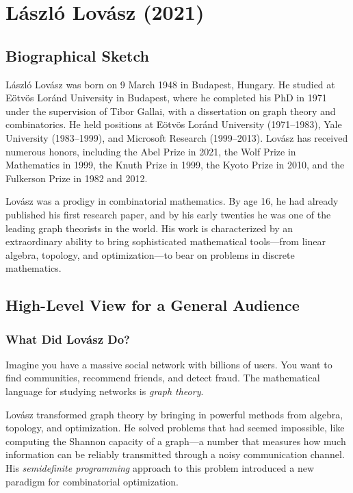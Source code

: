 \chapter{L\'aszl\'o Lov\'asz (2021)}

\section{Biographical Sketch}

L\'aszl\'o Lov\'asz was born on 9 March 1948 in Budapest, Hungary. He studied at E\"otv\"os Lor\'and University in Budapest, where he completed his PhD in 1971 under the supervision of Tibor Gallai, with a dissertation on graph theory and combinatorics. He held positions at E\"otv\"os Lor\'and University (1971--1983), Yale University (1983--1999), and Microsoft Research (1999--2013). Lov\'asz has received numerous honors, including the Abel Prize in 2021, the Wolf Prize in Mathematics in 1999, the Knuth Prize in 1999, the Kyoto Prize in 2010, and the Fulkerson Prize in 1982 and 2012.

Lov\'asz was a prodigy in combinatorial mathematics. By age 16, he had already published his first research paper, and by his early twenties he was one of the leading graph theorists in the world. His work is characterized by an extraordinary ability to bring sophisticated mathematical tools---from linear algebra, topology, and optimization---to bear on problems in discrete mathematics.

\section{High-Level View for a General Audience}

\subsection{What Did Lov\'asz Do?}

Imagine you have a massive social network with billions of users. You want to find communities, recommend friends, and detect fraud. The mathematical language for studying networks is \emph{graph theory}.

Lov\'asz transformed graph theory by bringing in powerful methods from algebra, topology, and optimization. He solved problems that had seemed impossible, like computing the Shannon capacity of a graph---a number that measures how much information can be reliably transmitted through a noisy communication channel. His \emph{semidefinite programming} approach to this problem introduced a new paradigm for combinatorial optimization.

